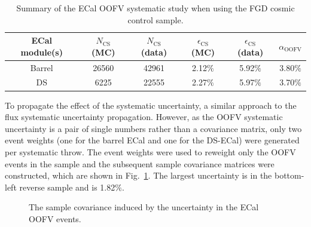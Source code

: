 \begin{table}
  \begin{tabular}{ c c c c c c }
    ECal module(s) & $N_{\textrm{CS}}$ (MC) & $N_{\textrm{CS}}$ (data) & $\epsilon_{\textrm{CS}}$ (MC) & $\epsilon_{\textrm{CS}}$ (data) & $\alpha_{\textrm{OOFV}}$ \\ \hline \hline
    Barrel & 26560 & 42961 & 2.12$\%$ & 5.92$\%$ & 3.80$\%$ \\
    DS & 6225 & 22555 & 2.27$\%$ & 5.97$\%$ & 3.70$\%$ \\
  \end{tabular}
  \caption{Summary of the ECal OOFV systematic study when using the FGD cosmic control sample.}
  \label{table:OOFVSystematicSummary}
\end{table}
\newline
\newline
To propagate the effect of the systematic uncertainty, a similar approach to the flux systematic uncertainty propagation.  However, as the OOFV systematic uncertainty is a pair of single numbers rather than a covariance matrix, only two event weights (one for the barrel ECal and one for the DS-ECal) were generated per systematic throw.  The event weights were used to reweight only the OOFV events in the sample and the subsequent sample covariance matrices were constructed, which are shown in Fig.~\ref{fig:ECalOOFVCovarianceMatrices}.  The largest uncertainty is in the bottom-left reverse sample and is 1.82$\%$.
\begin{figure}%
  \centering
  \caption{The sample covariance induced by the uncertainty in the ECal OOFV events.}
  \label{fig:ECalOOFVCovarianceMatrices}
\end{figure}
